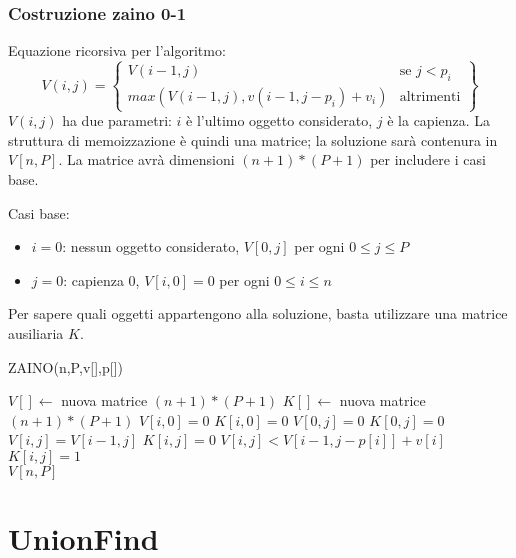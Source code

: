 \documentclass[11pt]{article}
\begin{document}
\subsubsection{Costruzione zaino 0-1}
Equazione ricorsiva per l'algoritmo:
\begin{equation*}
    V(i,j)=
    \left\{
        \begin{array}{lr}
            V(i-1,j)&\text{se } j<p_i\\
            max(V(i-1,j), v(i-1,j-p_i)+v_i)&\text{altrimenti}
        \end{array}
    \right\}
\end{equation*}
$V(i,j)$ ha due parametri: $i$ è l'ultimo oggetto considerato, $j$ è la capienza. La struttura di memoizzazione è quindi 
una matrice; la soluzione sarà contenura in $V[n,P]$. La matrice avrà dimensioni $(n+1)*(P+1)$ per includere i casi base. 

Casi base:
\begin{itemize}
    \item $i=0$: nessun oggetto considerato, $V[0,j]$ per ogni $0\leq j\leq P$
    \item $j=0$: capienza 0, $V[i,0]=0$ per ogni $0\leq i\leq n$
\end{itemize}
Per sapere quali oggetti appartengono alla soluzione, basta utilizzare una matrice ausiliaria $K$.
\begin{algorithm}
    \caption{ZAINO(n,P,v[],p[])}
    \begin{algorithmic}
        \State $V[]\gets$ nuova matrice $(n+1)*(P+1)$
        \State $K[]\gets$ nuova matrice $(n+1)*(P+1)$
            \State $V[i,0]=0$
            \State $K[i,0]=0$
        \EndFor
            \State $V[0,j]=0$
            \State $K[0,j]=0$
        \EndFor 
                \State $V[i,j]=V[i-1,j]$
                \State $K[i,j]=0$
                    \State $V[i,j]<V[i-1,j-p[i]]+v[i]$
                    \State $K[i,j]=1$
                \EndIf 
            \EndFor 
        \EndFor\\
        \Return $V[n,P]$
    \end{algorithmic}
\end{algorithm}
\section{UnionFind}
\end{document}
